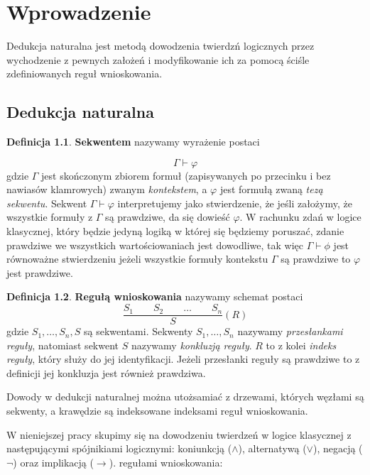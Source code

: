 \documentclass[shortabstract]{iithesis}
\author         {Maksymilian Debeściak}
\theoremstyle{definition}
\newtheorem{definition}{Definicja}
\theoremstyle{remark}
\theoremstyle{plain}
\begin{document}
\chapter{Wprowadzenie}
Dedukcja naturalna jest metodą dowodzenia twierdzń logicznych przez wychodzenie z pewnych założeń i modyfikowanie ich za pomocą
ściśle zdefiniowanych reguł wnioskowania. 
\section{Dedukcja naturalna}
\begin{definition}
\textbf{Sekwentem} nazywamy wyrażenie postaci

\[
\Gamma \vdash \varphi
\]
gdzie $\Gamma$ jest skończonym zbiorem formuł (zapisywanych po przecinku i bez nawiasów klamrowych) zwanym \emph{kontekstem},
a $\varphi$ jest formułą zwaną \emph{tezą sekwentu}. Sekwent $\Gamma \vdash \varphi$ interpretujemy jako stwierdzenie, że jeśli założymy, że wszystkie formuły z $\Gamma$ są prawdziwe, 
da się dowieść $\varphi$. W rachunku zdań w logice klasycznej, który będzie jedyną logiką w której się będziemy poruszać, zdanie prawdziwe we wszystkich wartościowaniach jest dowodliwe, tak więc $\Gamma \vdash \phi$ jest równoważne stwierdzeniu jeżeli wszystkie formuły kontekstu $\Gamma$ są prawdziwe to $\varphi$ jest prawdziwe.
\end{definition}


\begin{definition}
    \textbf{Regułą wnioskowania} nazywamy schemat postaci
\[
\frac{S_1 \qquad S_2 \qquad \dots \qquad S_n}{S}(R)
\]
gdzie $S_1,\dots,S_n,S$ są sekwentami. Sekwenty $S_1,\dots,S_n$ nazywamy \emph{przesłankami reguły}, natomiast sekwent $S$ nazywamy \emph{konkluzją reguły}. $R$ to z kolei \emph{indeks reguły}, który służy do jej identyfikacji. 
Jeżeli przesłanki reguły są prawdziwe to z definicji jej konkluzja jest również prawdziwa.
\end{definition}

Dowody w dedukcji naturalnej można utożsamiać z drzewami, których węzłami są sekwenty,
 a krawędzie są indeksowane indeksami reguł wnioskowania.

W nieniejszej pracy skupimy się na dowodzeniu twierdzeń w logice klasycznej z następującymi spójnikiami logicznymi: koniunkcją ($\land$), alternatywą ($\lor$), negacją ($\neg$) oraz implikacją ($\to$).
regułami wnioskowania:
\end{document}
